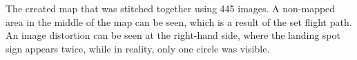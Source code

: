 \label{fig:mapexp}
The created map that was stitched together using 445 images. A non-mapped area in the middle of the map can be seen, which is a result of the set flight path. An image distortion can be seen at the right-hand side, where the landing spot sign appears twice, while in reality, only one circle was visible.